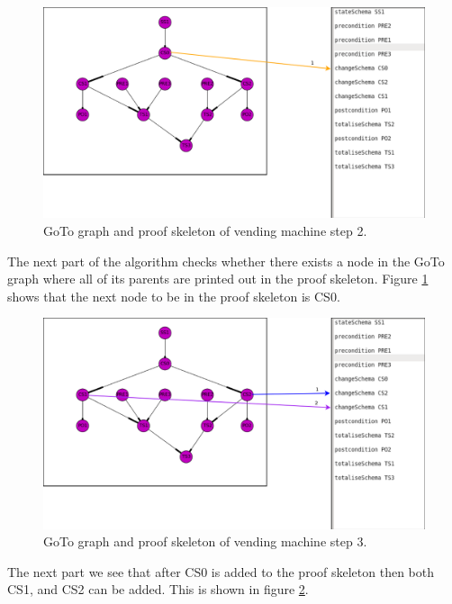 \begin{figure}[H]
\includegraphics[scale=0.3]{Figures/skeleton/2.png}
\caption{GoTo graph and proof skeleton of vending machine step 2.}
\label{fig:2}
\end{figure}

The next part of the algorithm checks whether there exists a node in the GoTo graph where all of its parents are printed out in the proof skeleton. Figure \ref{fig:2} shows that the next node to be in the proof skeleton is CS0. 

\begin{figure}[H]
\includegraphics[scale=0.3]{Figures/skeleton/3.png}
\caption{GoTo graph and proof skeleton of vending machine step 3.}
\label{fig:3}
\end{figure}

The next part we see that after CS0 is added to the proof skeleton then both CS1, and CS2 can be added. This is shown in figure \ref{fig:3}.

